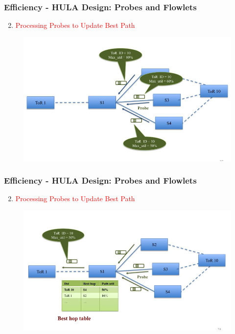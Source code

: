 \documentclass{beamer}
\begin{document}
\begin{frame}
	\frametitle{Efficiency - HULA Design: Probes and Flowlets}
	\begin{enumerate}
		\setcounter{enumi}{1}
		\item\textcolor{red}{Processing Probes to Update Best Path}\\
	\end{enumerate}
		\begin{figure}
			\includegraphics[width=1\linewidth]{9}
		\end{figure}
\end{frame}

\begin{frame}
	\frametitle{Efficiency - HULA Design: Probes and Flowlets}
	\begin{enumerate}
		\setcounter{enumi}{1}
		\item\textcolor{red}{Processing Probes to Update Best Path}\\
	\end{enumerate}
	\begin{figure}
		\includegraphics[width=1\linewidth]{10}
	\end{figure}
\end{frame}
\end{document}
